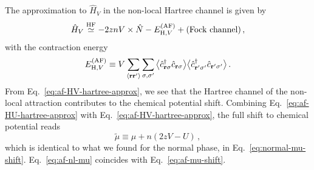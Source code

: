 The approximation to $\hat H_V$ in the non-local Hartree channel is given by
\begin{equation}\label{eq:af-HV-hartree-approx}
	\hat H_V \stackrel{\mathrm{HF}}{\simeq} -2znV \times \hat N - E_{\mathrm{H},V}^{(\mathrm{AF})} + (\text{Fock channel}) \, ,
\end{equation}
with the contraction energy
\begin{equation}\label{eq:af-HV-hartree-Ec-implicit}
	E_{\mathrm{H},V}^{(\mathrm{AF})} \equiv V \sum_{\ev{\mathbf{r}\mathbf{r}'}} \sum_{\sigma,\sigma'} \big\langle \hat c_{\mathbf{r}\sigma}^\dagger \hat c_{\mathbf{r}\sigma} \big\rangle  \big\langle \hat c_{\mathbf{r}'\sigma'}^\dagger \hat c_{\mathbf{r}'\sigma'} \big\rangle \, .
\end{equation}
From Eq.~\eqref{eq:af-HV-hartree-approx}, we see that the Hartree channel of the non-local attraction contributes to the chemical potential shift. Combining Eq.~\eqref{eq:af-HU-hartree-approx} with Eq.~\eqref{eq:af-HV-hartree-approx}, the full shift to chemical potential reads
\begin{equation}\label{eq:af-nl-mu}
	\tilde{\mu} \equiv \mu + n(2zV-U) \, ,
\end{equation}
which is identical to what we found for the normal phase, in Eq.~\eqref{eq:normal-mu-shift}. Eq.~\eqref{eq:af-nl-mu} coincides with Eq.~\eqref{eq:af-mu-shift}.

